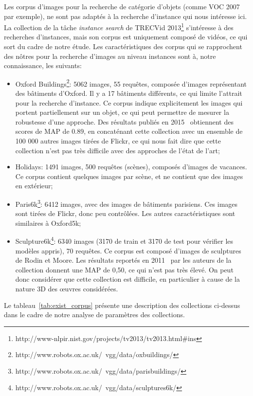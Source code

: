 Les corpus d'images pour la recherche de catégorie d'objets (comme VOC 2007~\cite{Everingham2010} par exemple), ne sont pas adaptés à la recherche d'instance qui nous intéresse ici. La collection de la tâche {\it instance search} de TRECVid 2013\footnote{http://www-nlpir.nist.gov/projects/tv2013/tv2013.html\#ins} s'intéresse à des recherches d'instances, mais son corpus est uniquement composé de vidéos, ce qui sort du cadre de notre étude. Les caractéristiques des corpus qui se rapprochent des nôtres pour la recherche d'images au niveau instances sont à, notre connaissance, les suivants:
\begin{itemize}
\item Oxford Buildings\footnote{http://www.robots.ox.ac.uk/~vgg/data/oxbuildings/}: 5062 images, 55 requêtes, composée d'images représentant des bâtiments d'Oxford. Il y a 17 bâtiments différents, ce qui limite l'attrait pour la recherche d'instance. Ce corpus indique explicitement les images qui  portent partiellement sur un objet, ce qui peut permettre de mesurer la robustesse d'une approche. Des résultats publiés en 2015~\cite{Chatfield2015}  obtiennent des scores de MAP de 0.89, en concaténant cette collection avec un ensemble de 100 000 autres images tirées de Flickr, ce qui nous fait dire que cette collection n'est pas très difficile avec des approches de l'état de l'art;
\item Holidays: 1491 images, 500 requêtes (scènes), composés d'images de vacances. Ce corpus contient quelques images par scène, et ne contient que des images en extérieur;
\item Paris6k\footnote{http://www.robots.ox.ac.uk/~vgg/data/parisbuildings/}: 6412 images, avec des images de bâtiments parisiens. Ces images sont tirées de Flickr, donc peu contrôlées. Les autres caractéristiques sont similaires à Oxford5k;
\item Sculpture6k\footnote{http://www.robots.ox.ac.uk/~vgg/data/sculptures6k/}: 6340 images (3170 de train et 3170 de test pour vérifier les modèles appris), 70 requêtes. Ce corpus est composé d'images de sculptures de Rodin et Moore. Les résultats reportés en 2011~\cite{Chatfield2015} par les auteurs de la collection donnent une MAP de 0,50, ce qui n'est pas très élevé. On peut donc considérer que cette collection est difficile, en particulier à cause de la nature 3D des œuvres considérées.
\end{itemize}

Le tableau~\ref{tab:exist_corpus} présente une description des collections ci-dessus dans le cadre de notre analyse de paramètres des collections.

